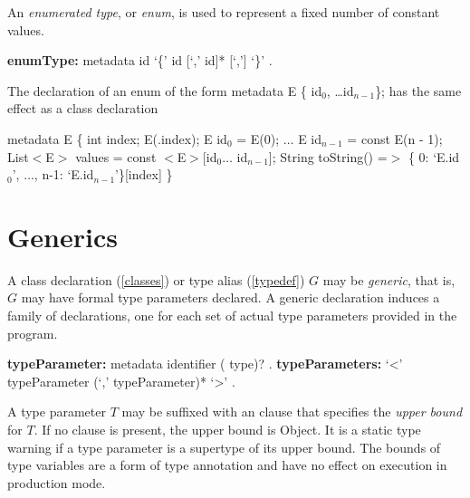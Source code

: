 \documentclass{article}
\newcommand{\code}[1]{{\sf #1}}
\begin{document}
\LMHash{}
An {\em enumerated type}, or {\em enum}, is used to represent a fixed number of constant values.

\begin{grammar}
{\bf enumType:}
metadata \ENUM{} id `\{' id [`,' id]* [`,'] `\}'
    .
\end{grammar}

\LMHash{}
The declaration of an enum of the form \code{metadata \ENUM{} E \{ id$_0$, \ldots id$_{n-1}$\};}
has the same effect as a class declaration

\begin{dartCode}
metadata \CLASS{} E \{
  \FINAL{} int index;
  \CONST{} E(\THIS{}.index);
  \STATIC{} \CONST{} E id$_0$ = \CONST{} E(0);
  $\ldots$
  \STATIC{} \CONST{} E id$_{n-1}$ = const E(n - 1);
  \STATIC{} \CONST{} List$<$E$>$ values = const $<$E$>$[id$_0 \ldots $ id$_{n-1}$];
  String toString() =$>$ \{ 0: `E.id$_0$', $\ldots$, n-1: `E.id$_{n-1}$'\}[index]
\}
\end{dartCode}


\section{Generics}

\LMHash{}
A class declaration (\ref{classes}) or type alias (\ref{typedef}) 
$G$ may be {\em generic}, that is, $G$ may have formal type parameters declared. A generic declaration induces a family of declarations, one for each set of actual type parameters provided in the program. 

\begin{grammar}
{\bf typeParameter:}
     metadata identifier (\EXTENDS{} type)?
    .
{\bf typeParameters:}
     `<' typeParameter (`,' typeParameter)* `>'
    .
\end{grammar}

\LMHash{}
A type parameter $T$ may be suffixed with an \EXTENDS{} clause that specifies the {\em upper bound} for $T$. If no  \EXTENDS{} clause is present, the upper bound is \code{Object}.  It is a static type warning if a type parameter is a supertype of its upper bound. The bounds of type variables are a form of type annotation and have no effect on execution in production mode.
\end{document}
